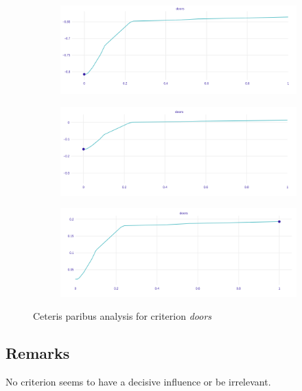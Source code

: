 \documentclass[../main.tex]{subfiles}
\begin{document}
\begin{figure}
    \centering
    \begin{subfigure}[b]{\linewidth}
        \includegraphics[width=\linewidth]{../img/doors_worst.png}
    \end{subfigure}
    \begin{subfigure}[b]{\linewidth}
        \includegraphics[width=\linewidth]{../img/doors_medium.png}
    \end{subfigure}
    \begin{subfigure}[b]{\linewidth}
        \includegraphics[width=\linewidth]{../img/doors_best.png}
    \end{subfigure}
    \caption{Ceteris paribus analysis for criterion \emph{doors}}
\end{figure}
\subsection{Remarks}


No criterion seems to have a decisive influence or be irrelevant.
\end{document}
